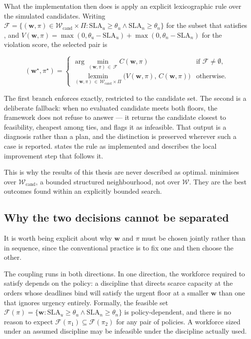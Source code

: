 What the implementation then does is apply an explicit lexicographic rule over the simulated
candidates. Writing \(\mathcal{F} = \{(\mathbf{w}, \pi) \in \mathcal{W}_{\text{cand}} \times \Pi
: \text{SLA}_u \geq \theta_u \wedge \text{SLA}_n \geq \theta_n\}\) for the subset that satisfies
, and \(V(\mathbf{w},\pi) = \max(0, \theta_u - \text{SLA}_u) +
\max(0, \theta_n - \text{SLA}_n)\) for the violation score, the selected pair is

\begin{equation}
(\mathbf{w}^\star, \pi^\star) =
\begin{cases}
\arg\min_{(\mathbf{w},\pi)\,\in\,\mathcal{F}} C(\mathbf{w}, \pi)
  & \text{if } \mathcal{F} \neq \emptyset, \\[6pt]
\operatorname*{lexmin}_{(\mathbf{w},\pi)\,\in\,\mathcal{W}_{\text{cand}} \times \Pi}
  \bigl(V(\mathbf{w}, \pi),\, C(\mathbf{w}, \pi)\bigr)
  & \text{otherwise.}
\end{cases}
\label{eq:selection}
\end{equation}

The first branch enforces  exactly, restricted to the candidate
set. The second is a deliberate fallback: when no evaluated candidate meets both floors, the
framework does not refuse to answer --- it returns the candidate closest to feasibility, cheapest
among ties, and flags it as infeasible. That output is a diagnosis rather than a plan, and the
distinction is preserved wherever such a case is reported.  states the
rule as implemented and  describes the local improvement step that follows it.

This is why the results of this thesis are never described as optimal. 
minimises over \(\mathcal{W}_{\text{cand}}\), a bounded structured neighbourhood, not over
\(\mathcal{W}\). They are the best outcomes found within an explicitly bounded search.

\subsection{Why the two decisions cannot be separated}
\label{sec:coupling}

It is worth being explicit about why \(\mathbf{w}\) and \(\pi\) must be chosen jointly rather
than in sequence, since the conventional practice is to fix one and then choose the other.

The coupling runs in both directions. In one direction, the workforce required to satisfy
 depends on the policy: a discipline that directs scarce capacity
at the orders whose deadlines bind will satisfy the urgent floor at a smaller \(\mathbf{w}\)
than one that ignores urgency entirely. Formally, the feasible set
\(\mathcal{F}(\pi) = \{\mathbf{w} : \text{SLA}_u \geq \theta_u \wedge \text{SLA}_n \geq
\theta_n\}\) is policy-dependent, and there is no reason to expect
\(\mathcal{F}(\pi_1) \subseteq \mathcal{F}(\pi_2)\) for any pair of policies. A workforce
sized under an assumed discipline may be infeasible under the discipline actually used.

